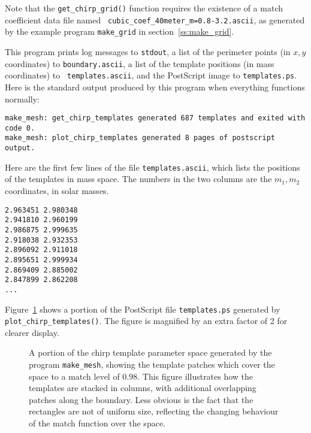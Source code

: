 Note that the {\tt get\_chirp\_grid()} function requires the existence
of a match coefficient data file named {\tt
cubic\_coef\_40meter\_m=0.8-3.2.ascii}, as generated by the example
program {\tt make\_grid} in section~\ref{ss:make_grid}.

This program prints log messages to {\tt stdout}, a list of the
perimeter points (in $x,y$ coordinates) to {\tt boundary.ascii}, a
list of the template positions (in mass coordinates) to {\tt
templates.ascii}, and the PostScript image to {\tt templates.ps}.
Here is the standard output produced by this program when everything
functions normally:

\begin{verbatim}
make_mesh: get_chirp_templates generated 687 templates and exited with code 0.
make_mesh: plot_chirp_templates generated 8 pages of postscript output.
\end{verbatim}

Here are the first few lines of the file {\tt templates.ascii}, which
lists the positions of the templates in mass space.  The numbers in
the two columns are the $m_1,m_2$ coordinates, in solar masses.

\begin{verbatim}
2.963451 2.980348
2.941810 2.960199
2.986875 2.999635
2.918038 2.932353
2.896092 2.911018
2.895651 2.999934
2.869409 2.885002
2.847899 2.862208
...
\end{verbatim}

Figure~\ref{f:template_mesh} shows a portion of the PostScript file
{\tt templates.ps} generated by {\tt plot\_chirp\_templates()}.  The
figure is magnified by an extra factor of 2 for clearer display.

\begin{figure}[h]
\begin{center}
\caption{ \label{f:template_mesh}
  A portion of the chirp template parameter space generated by the
  program {\tt make\_mesh}, showing the template patches which cover
  the space to a match level of 0.98.  This figure illustrates how the
  templates are stacked in columns, with additional overlapping
  patches along the boundary.  Less obvious is the fact that the
  rectangles are not of uniform size, reflecting the changing
  behaviour of the match function over the space. }
\end{center}
\end{figure}


